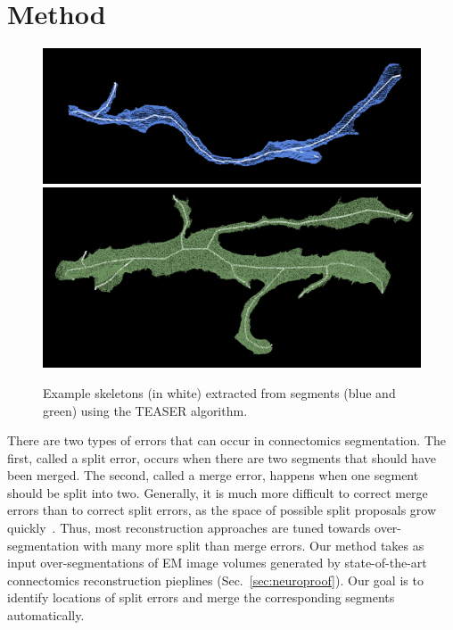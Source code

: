 \section{Method}

\begin{figure}[t]
	\centering
	\includegraphics[width=0.92\linewidth]{./figures/skeleton1.png}
	\includegraphics[width=0.92\linewidth]{./figures/skeleton2.png}
	\caption{Example skeletons (in white) extracted from segments (blue and green) using the TEASER algorithm.}
	\label{fig:skeletonization}
\end{figure}

There are two types of errors that can occur in connectomics segmentation.
The first, called a split error, occurs when there are two segments that should have been merged. The second, called a merge error, happens when one segment should be split into two. Generally, it is much more difficult to correct merge errors than to correct split errors,
as the space of possible split proposals grow quickly~\cite{parag2015properties}.
Thus, most reconstruction approaches are tuned towards over-segmentation with many more split than merge errors. Our method takes as input over-segmentations of EM image volumes generated by state-of-the-art connectomics reconstruction pieplines (Sec.~\ref{sec:neuroproof}). Our goal is to identify locations of split errors and merge the corresponding segments automatically.

